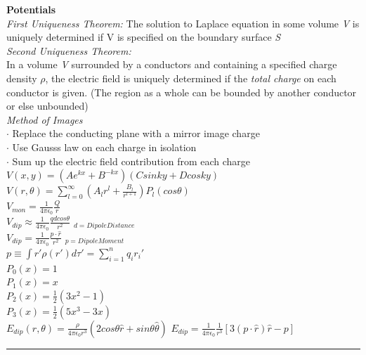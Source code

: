 \documentclass[1pt]{report}
\begin{document}
\begin{multicols}{3}
\begin{flushleft}
\textbf{Potentials}\\
\textit{First Uniqueness Theorem:}
The solution to Laplace equation in some volume \textit{V} is uniquely determined if V is specified on the boundary surface \textit{S}\\
\textit{Second Uniqueness Theorem:}\\
In a volume \textit{V} surrounded by a conductors and containing a specified charge density \textit{$\rho$}, the electric field is uniquely determined if the \textit{total charge} on each conductor is given. (The region as a whole can be bounded by another conductor or else unbounded)\\
\textit{Method of Images}\\
\textbf{$\cdot$} Replace the conducting plane with a mirror image charge\\
\textbf{$\cdot$} Use Gausss law on each charge in isolation\\
\textbf{$\cdot$} Sum up the electric field contribution from each charge\\
$V(x,y)=(Ae^{kx}+B^{-kx})(Csin\textit{ky}+Dcos\textit{ky})$
$V(r,\theta)=\sum_{l=0}^{\infty}(A_lr^l+\frac{B_l}{r^{l+1}})P_l(cos\theta)$\\
$V_{mon}=\frac{1}{4\pi\epsilon_0}\frac{Q}{r}$\\
$V_{dip}\approx\frac{1}{4\pi\epsilon_0}\frac{qdcos\theta}{r^2}$ $_{d=DipoleDistance}$\\
$V_{dip}=\frac{1}{4\pi\epsilon_0}\frac{p\cdot\hat{r}}{r^2}$ $_{p=DipoleMoment}$\\
$p\equiv\int r'\rho(r')d\tau'=\sum_{i=1}^{n}q_ir_i'$\\
$P_0(x) = 1$\\
$P_1(x) = x$\\
$P_2(x) = \frac{1}{2}(3x^2 - 1)$\\
$P_3(x) = \frac{1}{2}(5x^3-3x)$\\
$E_{dip}(r,\theta)=\frac{\rho}{4\pi\epsilon_0r^3}(2cos\theta\hat{r}+sin\theta\hat{\theta})$
$E_{dip}=\frac{1}{4\pi\epsilon_0}\frac{1}{r^3}[3(p\cdot\hat{r})\hat{r}-p]$\\

\noindent\rule[0.5ex]{\linewidth}{1pt}


\end{flushleft}
\end{multicols}
\end{document}
